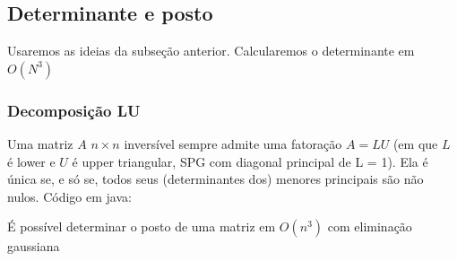 \subsection{Determinante e posto}

Usaremos as ideias da subseção anterior. Calcularemos o determinante em $O(N^3)$


\subsubsection{Decomposição LU}

Uma matriz $A$ $n \times n$ inversível sempre admite uma fatoração $A = LU$ (em que $L$ é lower e $U$ é upper triangular, SPG com diagonal principal de L = 1). Ela é única se, e só se, todos seus (determinantes dos) menores principais são não nulos.  Código em java:


É possível determinar o posto de uma matriz em $O(n^3)$ com eliminação gaussiana

